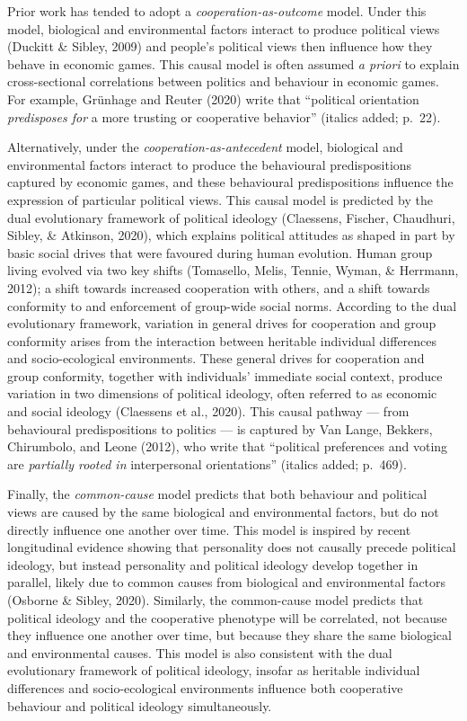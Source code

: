 \documentclass[
  man,floatsintext]{apa6}
\begin{document}
Prior work has tended to adopt a \emph{cooperation-as-outcome} model. Under this
model, biological and environmental factors interact to produce political
views (Duckitt \& Sibley, 2009) and people's political views then influence how they
behave in economic games. This causal model is often assumed \emph{a priori} to
explain cross-sectional correlations between politics and behaviour in economic
games. For example, Grünhage and Reuter (2020) write that ``political orientation
\emph{predisposes for} a more trusting or cooperative behavior'' (italics added; p.~22).

Alternatively, under the \emph{cooperation-as-antecedent} model, biological and
environmental factors interact to produce the behavioural predispositions
captured by economic games, and these behavioural predispositions influence the
expression of particular political views. This causal model is predicted by the
dual evolutionary framework of political ideology (Claessens, Fischer, Chaudhuri, Sibley, \& Atkinson, 2020), which
explains political attitudes as shaped in part by basic social drives that were
favoured during human evolution. Human group living evolved via two key shifts
(Tomasello, Melis, Tennie, Wyman, \& Herrmann, 2012); a shift towards increased cooperation with others, and a shift
towards conformity to and enforcement of group-wide social norms. According to
the dual evolutionary framework, variation in general drives for cooperation and
group conformity arises from the interaction between heritable individual
differences and socio-ecological environments. These general drives for
cooperation and group conformity, together with individuals' immediate social
context, produce variation in two dimensions of political ideology, often
referred to as economic and social ideology (Claessens et al., 2020). This causal
pathway --- from behavioural predispositions to politics --- is captured by
Van Lange, Bekkers, Chirumbolo, and Leone (2012), who write that ``political preferences and voting are \emph{partially
rooted in} interpersonal orientations'' (italics added; p.~469).

Finally, the \emph{common-cause} model predicts that both behaviour and political
views are caused by the same biological and environmental factors, but do not
directly influence one another over time. This model is inspired by recent
longitudinal evidence showing that personality does not causally precede
political ideology, but instead personality and political ideology develop
together in parallel, likely due to common causes from biological and
environmental factors (Osborne \& Sibley, 2020). Similarly, the common-cause model predicts
that political ideology and the cooperative phenotype will be correlated, not
because they influence one another over time, but because they share the same
biological and environmental causes. This model is also consistent with the dual
evolutionary framework of political ideology, insofar as heritable individual
differences and socio-ecological environments influence both cooperative
behaviour and political ideology simultaneously.
\end{document}

